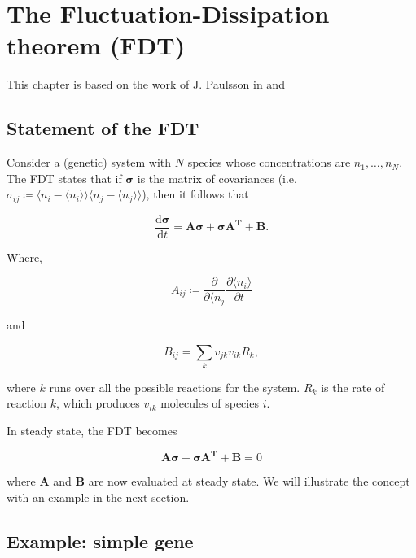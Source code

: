 \chapter{The Fluctuation-Dissipation theorem (FDT)}

This chapter is based on the work of J. Paulsson in \cite{paulsson04} and \cite{paulsson05}


\section{Statement of the FDT}


Consider a (genetic) system with $N$ species whose concentrations are $n_1,\dotsc,n_N$. The FDT states that if $\mathbf{\sigma}$ is the matrix of covariances (i.e. $\sigma_{ij} \coloneqq \langle n_i-\langle n_i\rangle\rangle\langle n_j-\langle n_j\rangle\rangle$), then it follows that 

\begin{equation}
  \label{eq:fdt-fdt1}
  \frac{\mathrm{d}\mathbf{\sigma}}{\mathrm{d}t} = \mathbf{A\sigma} + \mathbf{\sigma A^T}+\mathbf{B}.
\end{equation}

Where,

\begin{equation*}
  A_{ij} \coloneqq \frac{\partial}{\partial \langle n_j}\frac{\partial \langle n_i\rangle}{\partial t}
\end{equation*}

and

\begin{equation*}
  B_{ij} = \sum_k v_{jk}v_{ik}R_k,
\end{equation*}

where $k$ runs over all the possible reactions for the system. $R_k$ is the rate of reaction $k$, which produces $v_{ik}$ molecules of species $i$.

In steady state, the FDT becomes

\begin{equation}
  \label{eq:fdt-fdtss}
  \mathbf{A\sigma}+\mathbf{\sigma A^T}+\mathbf{B} = 0
\end{equation}

where $\mathbf{A}$ and $\mathbf{B}$ are now evaluated at steady state. We will illustrate the concept with an example in the next section.

\section{Example: simple gene}


